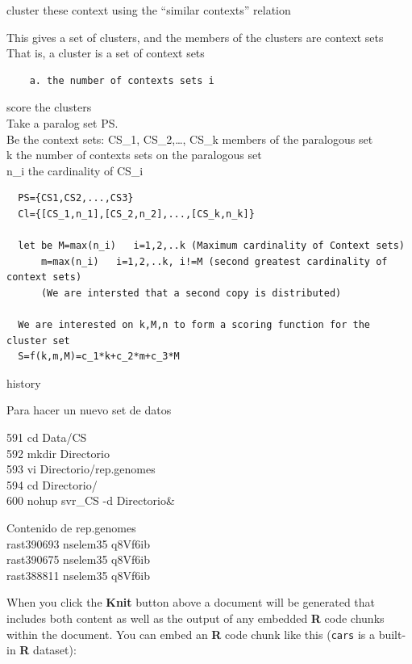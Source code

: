 \documentclass[12pt,twoside]{reedthesis}
\begin{document}
  cluster these context using the ``similar contexts'' relation
  
  This gives a set of clusters, and the members of the clusters are
  context sets\\
  That is, a cluster is a set of context sets
  
  \begin{verbatim}
    a. the number of contexts sets i  
  \end{verbatim}
  
  score the clusters\\
  Take a paralog set PS.\\
  Be the context sets: CS\_1, CS\_2,\ldots{}, CS\_k members of the
  paralogous set\\
  k the number of contexts sets on the paralogous set\\
  n\_i the cardinality of CS\_i
  
  \begin{verbatim}
  PS={CS1,CS2,...,CS3}  
  Cl={[CS_1,n_1],[CS_2,n_2],...,[CS_k,n_k]}  
  
  let be M=max(n_i)   i=1,2,..k (Maximum cardinality of Context sets)  
      m=max(n_i)   i=1,2,..k, i!=M (second greatest cardinality of context sets)  
      (We are intersted that a second copy is distributed)  
  
  We are interested on k,M,n to form a scoring function for the cluster set  
  S=f(k,m,M)=c_1*k+c_2*m+c_3*M  
  \end{verbatim}
  
  history
  
  Para hacer un nuevo set de datos
  
  591 cd Data/CS\\
  592 mkdir Directorio\\
  593 vi Directorio/rep.genomes\\
  594 cd Directorio/\\
  600 nohup svr\_CS -d Directorio\&
  
  Contenido de rep.genomes\\
  rast\textbar{}390693 nselem35 q8Vf6ib\\
  rast\textbar{}390675 nselem35 q8Vf6ib\\
  rast\textbar{}388811 nselem35 q8Vf6ib
  
  When you click the \textbf{Knit} button above a document will be
  generated that includes both content as well as the output of any
  embedded \textbf{R} code chunks within the document. You can embed an
  \textbf{R} code chunk like this (\texttt{cars} is a built-in \textbf{R}
  dataset):
  
\end{document}
